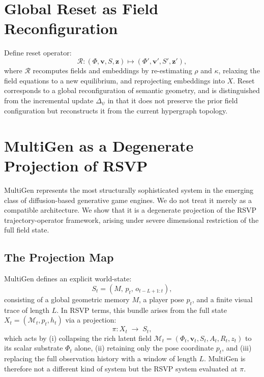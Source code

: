 \documentclass[11pt]{article}
\begin{document}
\section{Global Reset as Field Reconfiguration}

Define reset operator:
\[
\mathcal{R}: (\Phi,\mathbf{v},S,\mathbf{z})\mapsto
(\Phi',\mathbf{v}',S',\mathbf{z}'),
\]
where $\mathcal{R}$ recomputes fields and embeddings by re-estimating
$\rho$ and $\kappa$, relaxing the field equations to a new equilibrium,
and reprojecting embeddings into $X$.
Reset corresponds to a global reconfiguration of semantic geometry,
and is distinguished from the incremental update $\Delta_\psi$ in that
it does not preserve the prior field configuration but reconstructs it
from the current hypergraph topology.

\section{MultiGen as a Degenerate Projection of RSVP}
\label{sec:multigen}

MultiGen \cite{po2026multigen} represents the most structurally
sophisticated system in the emerging class of diffusion-based generative
game engines.
We do not treat it merely as a compatible architecture.
We show that it is a degenerate projection of the RSVP trajectory-operator
framework, arising under severe dimensional restriction of the full field
state.

\subsection{The Projection Map}

MultiGen defines an explicit world-state:
\[
S_t = (M,\, p_t,\, o_{t-L+1:t}),
\]
consisting of a global geometric memory $M$, a player pose $p_t$, and a
finite visual trace of length $L$.
In RSVP terms, this bundle arises from the full state
$X_t = (\mathcal{M}_t, p_t, h_t)$ via a projection:
\[
\pi : X_t \;\longrightarrow\; S_t,
\]
which acts by (i) collapsing the rich latent field
$\mathcal{M}_t = (\Phi_t, \mathbf{v}_t, S_t, A_t, R_t, z_t)$ to its
scalar substrate $\Phi_t$ alone, (ii) retaining only the pose coordinate
$p_t$, and (iii) replacing the full observation history with a window of
length $L$.
MultiGen is therefore not a different kind of system but the RSVP system
evaluated at $\pi$.
\end{document}

